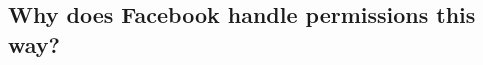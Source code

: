 \documentclass[10pt]{sig-alternate-10pt}
\begin{document}
\subsection{Why does Facebook handle permissions this way?}
\label{sec:investigationdiscussion}

\end{document}

